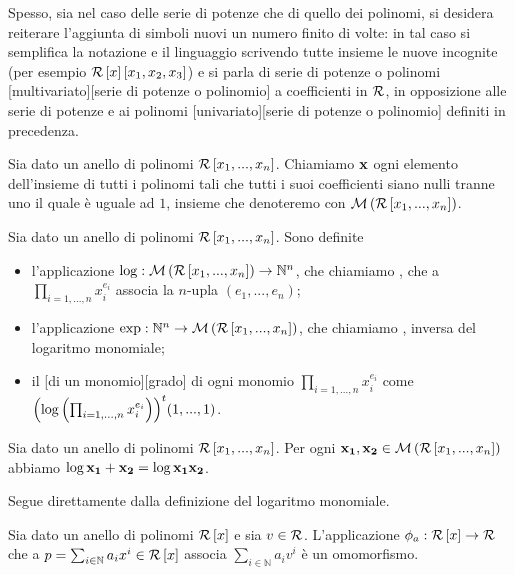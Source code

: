 \par Spesso, sia nel caso delle serie di potenze che di quello dei polinomi, si desidera reiterare l'aggiunta di simboli nuovi un numero finito di volte: in tal caso si semplifica la notazione e il linguaggio scrivendo tutte insieme le nuove incognite (per esempio $\mathcal{R} \left [ x \right ] \left [ x_1,x_2,x_3 \right ]$) e si parla di serie di potenze o polinomi [multivariato][serie di potenze o polinomio] a coefficienti in $\mathcal{R}$, in opposizione alle serie di potenze e ai polinomi [univariato][serie di potenze o polinomio] definiti in precedenza.
\begin{Definition}
	Sia dato un anello di polinomi $\mathcal{R} \left [ x_1, ..., x_n \right ]$. Chiamiamo  $\mathbf{x}$ ogni elemento dell'insieme di tutti i polinomi tali che tutti i suoi coefficienti siano nulli tranne uno il quale \`e uguale ad $1$, insieme che denoteremo con $\mathcal{M}\left ( \mathcal{R} \left [ x_1, ..., x_n \right ] \right )$.
\end{Definition}
\begin{Definition}
	Sia dato un anello di polinomi $\mathcal{R} \left [ x_1, ..., x_n \right ]$. Sono definite
	\begin{itemize}
		\item l'applicazione $\log: \mathcal{M}\left ( \mathcal{R} \left [ x_1, ..., x_n \right ] \right ) \rightarrow \mathbb{N}^n$, che chiamiamo , che a $\prod_{i = 1, ..., n} x_i^{e_i}$ associa la $n$-upla $(e_1, ..., e_n)$;
		\item l'applicazione $\exp: \mathbb{N}^n \rightarrow \mathcal{M}\left ( \mathcal{R} \left [ x_1, ..., x_n \right ] \right )$, che chiamiamo , inversa del logaritmo monomiale;
		\item il [di un monomio][grado] di ogni monomio $\prod_{i = 1, ..., n} x_i^{e_i}$ come ${ \left ( \log \left ( \prod_{i = 1, ..., n} x_i^{e_i} \right ) \right )}^t (1, ..., 1)$.
	\end{itemize}
\end{Definition}
\begin{Theorem}
	Sia dato un anello di polinomi $\mathcal{R} \left [ x_1, ..., x_n \right ]$. Per ogni $\mathbf{x_1}, \mathbf{x_2} \in \mathcal{M}\left ( \mathcal{R} \left [ x_1, ..., x_n \right ] \right )$ abbiamo $\log{\mathbf{x_1} + \mathbf{x_2}} = \log{\mathbf{x_1}\mathbf{x_2}}$.
\end{Theorem}
\Proof Segue direttamente dalla definizione del logaritmo monomiale. \EndProof
\begin{Theorem}
	Sia dato un anello di polinomi $\mathcal{R} \left [ x \right ]$ e sia $v \in \mathcal{R}$. L'applicazione $\phi_a: \mathcal{R} \left [ x \right ] \rightarrow \mathcal{R}$ che a $p = \sum_{i \in \mathbb{N}} a_ix^i \in \mathcal{R} \left [ x \right ]$ associa $\sum_{i \in \mathbb{N}} a_iv^i$ \`e un omomorfismo.
\end{Theorem}
